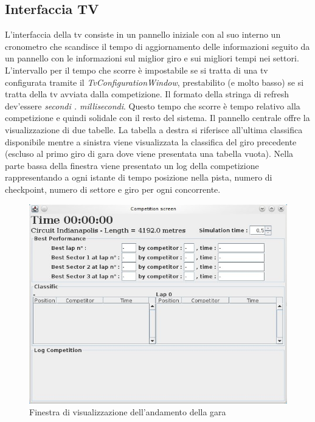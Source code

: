 \subsection{Interfaccia TV}
\label{interfacciaTv}
L'interfaccia della tv consiste in un pannello iniziale con al suo interno un cronometro che scandisce il tempo di aggiornamento delle informazioni seguito da un pannello con le informazioni sul miglior giro e sui migliori tempi nei settori.
L'intervallo per il tempo che scorre \`{e} impostabile se si tratta di una tv configurata tramite il \emph{TvConfigurationWindow}, prestabilito (e molto basso) se si tratta della tv avviata dalla competizione. Il formato della stringa di refresh dev'essere \emph{secondi . millisecondi}.
Questo tempo che scorre \`{e} tempo relativo alla competizione e quindi solidale con il resto del sistema.
Il pannello centrale offre la visualizzazione di due tabelle. La tabella a destra si riferisce all'ultima classifica disponibile mentre a sinistra viene visualizzata la classifica del giro precedente (escluso al primo giro di gara dove viene presentata una tabella vuota).
Nella parte bassa della finestra viene presentato un log della competizione rappresentando a ogni istante di tempo posizione nella pista, numero di checkpoint, numero di settore e giro per ogni concorrente.
\begin{center}
\begin{figure}[h]
	\includegraphics[scale=0.75]{screenshotRelazione/competition2.jpeg}
	\caption{Finestra di visualizzazione dell'andamento della gara}
\end{figure}
\end{center}
